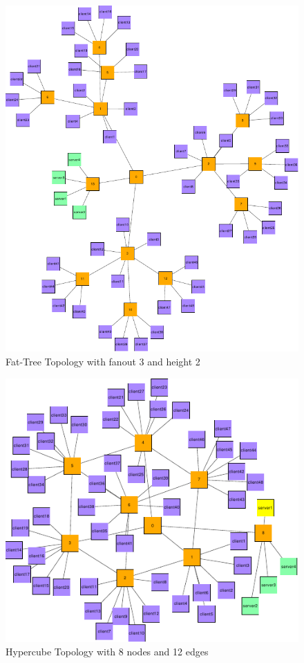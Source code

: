 \begin{figure}
    \centering
    \includegraphics[width=\linewidth]{Networks/Balanced Tree_final.pdf}
    \caption{Fat-Tree Topology with fanout 3 and height 2}
    \label{fig:BalancedTree}
\end{figure}

\begin{figure}
    \centering
    \includegraphics[width=\linewidth]{Networks/Hypercube_final.pdf}
    \caption{Hypercube Topology with 8 nodes and 12 edges}
    \label{fig:Hypercube}
\end{figure}

